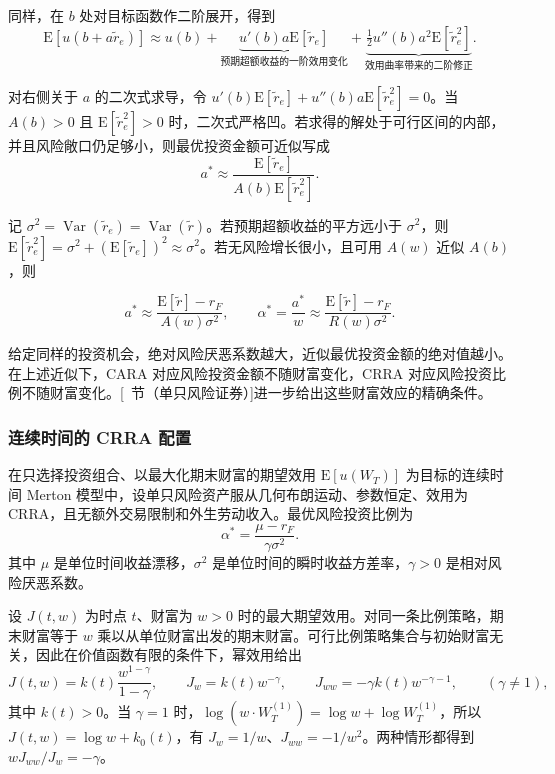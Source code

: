 同样，在 $b$ 处对目标函数作二阶展开，得到
\[
 \mathrm E[u(b+a\tilde r_e)]\approx u(b)
 +\underbrace{u'(b)a\mathrm E[\tilde r_e]}_{\text{预期超额收益的一阶效用变化}}
 +\underbrace{\tfrac12u''(b)a^2\mathrm E[\tilde r_e^2]}_{\text{效用曲率带来的二阶修正}}.
\]

对右侧关于 $a$ 的二次式求导，令 $u'(b)\mathrm E[\tilde r_e]+u''(b)a\mathrm E[\tilde r_e^2]=0$。当 $A(b)>0$ 且 $\mathrm E[\tilde r_e^2]>0$ 时，二次式严格凹。若求得的解处于可行区间的内部，并且风险敞口仍足够小，则最优投资金额可近似写成
\[
 a^*\approx\frac{\mathrm E[\tilde r_e]}{A(b)\mathrm E[\tilde r_e^2]}.
\]

记 $\sigma^2=\operatorname{Var}(\tilde r_e)=\operatorname{Var}(\tilde r)$。若预期超额收益的平方远小于 $\sigma^2$，则 $\mathrm E[\tilde r_e^2]=\sigma^2+(\mathrm E[\tilde r_e])^2\approx\sigma^2$。若无风险增长很小，且可用 $A(w)$ 近似 $A(b)$，则
\begin{tcolorbox}[knowledge,title=风险投资金额与比例的局部近似]
\[
 a^*\approx\frac{\mathrm E[\tilde r]-r_F}{A(w)\sigma^2},\qquad
 \alpha^*=\frac{a^*}{w}\approx
 \frac{\mathrm E[\tilde r]-r_F}{R(w)\sigma^2}.
\]
\end{tcolorbox}
给定同样的投资机会，绝对风险厌恶系数越大，近似最优投资金额的绝对值越小。在上述近似下，CARA 对应风险投资金额不随财富变化，CRRA 对应风险投资比例不随财富变化。[~节（单只风险证券）]进一步给出这些财富效应的精确条件。

\subsubsection{连续时间的 CRRA 配置}
\begin{tcolorbox}[knowledge,title=连续时间的 CRRA 最优比例]
在只选择投资组合、以最大化期末财富的期望效用 $\mathrm E[u(W_T)]$ 为目标的连续时间 Merton 模型中，设单只风险资产服从几何布朗运动、参数恒定、效用为 CRRA，且无额外交易限制和外生劳动收入。最优风险投资比例为
\[
 \alpha^*=\frac{\mu-r_F}{\gamma\sigma^2}.
\]
其中 $\mu$ 是单位时间收益漂移，$\sigma^2$ 是单位时间的瞬时收益方差率，$\gamma>0$ 是相对风险厌恶系数。
\end{tcolorbox}
设 $J(t,w)$ 为时点 $t$、财富为 $w>0$ 时的最大期望效用。对同一条比例策略，期末财富等于 $w$ 乘以从单位财富出发的期末财富。可行比例策略集合与初始财富无关，因此在价值函数有限的条件下，幂效用给出
\[
 J(t,w)=k(t)\frac{w^{1-\gamma}}{1-\gamma},\qquad
 J_w=k(t)w^{-\gamma},\qquad
 J_{ww}=-\gamma k(t)w^{-\gamma-1},
 \qquad (\gamma\ne1),
\]
其中 $k(t)>0$。当 $\gamma=1$ 时，$\log(w\cdot W_T^{(1)})=\log w+\log W_T^{(1)}$，所以 $J(t,w)=\log w+k_0(t)$，有 $J_w=1/w$、$J_{ww}=-1/w^2$。两种情形都得到 $wJ_{ww}/J_w=-\gamma$。

